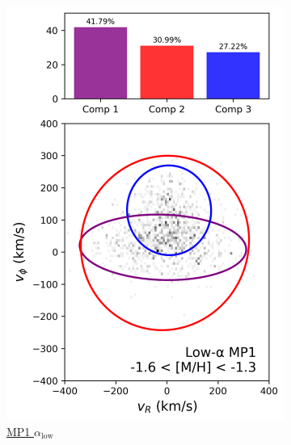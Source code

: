 \documentclass[a4paper,10pt]{article}
\begin{document}
\begin{multicols}{2}
\begin{figure}[H]
\begin{subfigure}[t]{0.24\linewidth}
    \includegraphics[width=\linewidth]{../figures/gmm_mp1_low_alpha_k4.png}
    \caption{\href{https://raw.githack.com/raunaq-rai/Disentangling-the-Milky-Way-using-GMM/main/figures/MP1\_low\_\_\_\_-1.6\%5BM\_H\%5D-1.3.html}{MP1 $\alpha_{\mathrm{low}}$}}
    \label{fig:low_mp1}
  \end{subfigure}\hfill
  \begin{subfigure}[t]{0.24\linewidth}

\end{subfigure}
\end{figure}
\end{multicols}
\end{document}
